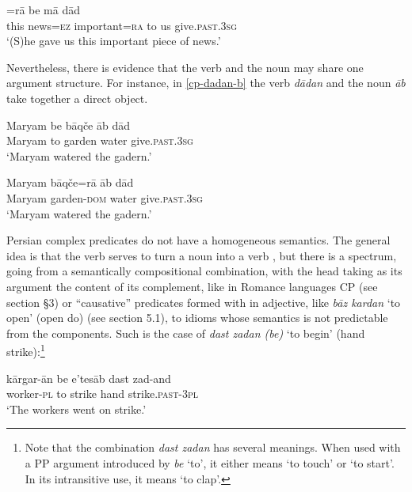 \documentclass[output=paper]{langsci/langscibook}
\begin{document}
	\begin{exe}
		\ex \label{pers-mod}
		\gll [In \textit{xabar}=e mohem]=r\=a be m\=a d\=ad\\
		this  news=\textsc{ez} important=\textsc{ra} to us give.\textsc{past.3sg}\\
		\glt `(S)he gave us this important piece of news.'
	\end{exe}
	
	
	Nevertheless, there is evidence that the verb and the noun may share one argument structure. For instance, in \ref{cp-dadan-b} the verb \textit{d\=adan} and the noun \textit{\=ab} take together a direct object.
	
	\begin{exe}
		\ex \label{cp-dadan}
			\begin{xlist} 
		
		\ex \label{cp-dadan-a}
		\gll Maryam be b\=aq\v{c}e \=ab d\=ad\\
		Maryam to garden water give.\textsc{past.3sg}\\
		\glt `Maryam watered the gadern.'
		
			\ex \label{cp-dadan-b}
		\gll Maryam b\=aq\v{c}e=r\=a \=ab d\=ad\\
		Maryam garden-\textsc{dom} water give.\textsc{past.3sg}\\
		\glt `Maryam watered the gadern.'
		
			\end{xlist}
			\end{exe}
	
	
	
	Persian complex predicates do not have a homogeneous semantics. The general idea is that the verb serves to turn a noun into a verb \citep{BS2010}, but there is a spectrum, going from a semantically compositional combination, with the head taking as its argument the content of its complement, like in Romance languages CP (see section §3) or  ``causative'' predicates formed with in adjective, like \textit{b\=az kardan} `to open' (open do) (see section 5.1), to idioms whose semantics is not predictable from the components. Such is the case of \textit{dast zadan (be)} `to begin' (hand strike):\footnote{Note that the combination \textit{dast zadan} has several meanings. When used with a PP argument introduced by \textit{be} `to', it either means `to touch' or `to start'. In its intransitive use, it means `to clap'.}
	
	
	\begin{exe}
	\ex \label{dast-zadan-be}
	\gll k\=argar-\=an be e'tes\=ab dast zad-and\\
	worker-\textsc{pl} to strike hand strike.\textsc{past-3pl}\\
    \glt `The workers went on strike.'
		
    \end{exe}
	
\end{document}

